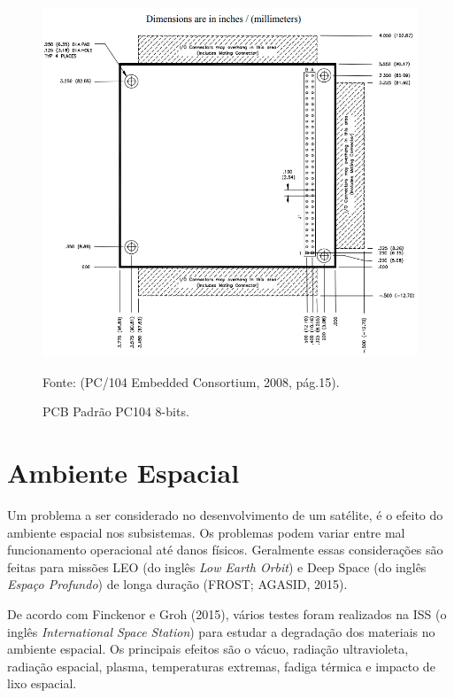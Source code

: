 \begin{figure}[h]
	\centering
    \caption{ PCB Padrão PC104 8-bits.}
    
	\includegraphics[keepaspectratio=true,scale=0.55]{figuras/pc104.PNG}
	
	Fonte: (PC/104 Embedded Consortium, 2008, pág.15).\linebreak
	\label{fig16}
\end{figure}

\section{Ambiente Espacial}
Um problema a ser considerado no desenvolvimento de um satélite, é o efeito do ambiente espacial nos subsistemas. Os problemas podem variar entre mal funcionamento operacional até danos físicos. Geralmente essas considerações são feitas para missões LEO (do inglês \textit{Low Earth Orbit}) e Deep Space (do inglês \textit{Espaço Profundo}) de longa duração (FROST; AGASID, 2015).

De acordo com Finckenor e Groh (2015), vários testes foram realizados na ISS (o inglês \textit{International Space Station}) para estudar a degradação dos materiais no ambiente espacial. Os principais efeitos são o vácuo, radiação ultravioleta, radiação espacial, plasma, temperaturas extremas, fadiga térmica e impacto de lixo espacial. 

